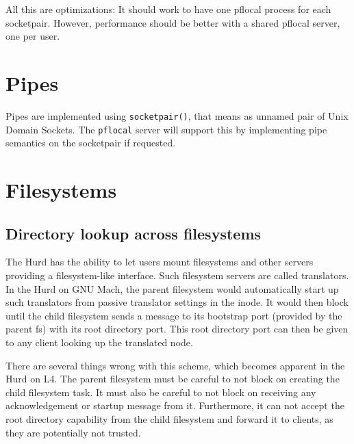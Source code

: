 All this are optimizations: It should work to have one pflocal process
for each socketpair.  However, performance should be better with a
shared pflocal server, one per user.


\section{Pipes}

Pipes are implemented using \texttt{socketpair()}, that means as
unnamed pair of Unix Domain Sockets.  The \texttt{pflocal} server will
support this by implementing pipe semantics on the socketpair if
requested.

\begin{comment}
  It was considered to use shared memory for the pipe implementation.
  But we are not aware of a lock-free protocol using shared memory
  with multiple readers and multiple writers.  It might be possible,
  but it is not obvious if that would be faster: Pipes are normally
  used with \texttt{read()} and \texttt{write()}, so the data has to
  be copied from and to the supplied buffer.  This can be done
  efficiently in L4 even across address spaces using string items.  In
  the implementation using sockets, the \texttt{pflocal} server
  handles concurrent read and write accesses with mutual exclusion.
\end{comment}


\section{Filesystems}

\subsection{Directory lookup across filesystems}
\label{xfslookup}

The Hurd has the ability to let users mount filesystems and other
servers providing a filesystem-like interface.  Such filesystem
servers are called translators.  In the Hurd on GNU Mach, the parent
filesystem would automatically start up such translators from passive
translator settings in the inode.  It would then block until the child
filesystem sends a message to its bootstrap port (provided by the
parent fs) with its root directory port.  This root directory port can
then be given to any client looking up the translated node.

There are several things wrong with this scheme, which becomes
apparent in the Hurd on L4.  The parent filesystem must be careful to
not block on creating the child filesystem task.  It must also be
careful to not block on receiving any acknowledgement or startup
message from it.  Furthermore, it can not accept the root directory
capability from the child filesystem and forward it to clients, as
they are potentially not trusted.

